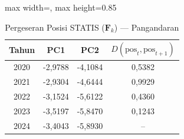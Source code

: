 \begin{table}[H]
\centering
\caption{Pergeseran Posisi STATIS ($\mathbf{F}_k$) --- Pangandaran} \label{tab:app2jarak_statis_skor_pangandaran}
\begin{adjustbox}{max width=\textwidth, max height=0.85\textheight}
\begin{tabular}{|c|c|c|c|}
\hline
\textbf{Tahun} & \textbf{PC1} & \textbf{PC2} & \textbf{$D(\text{pos}_t, \text{pos}_{t+1})$} \\
\hline
2020 & -2,9788 & -4,1084 & 0,5382 \\
2021 & -2,9304 & -4,6444 & 0,9929 \\
2022 & -3,1524 & -5,6122 & 0,4360 \\
2023 & -3,5197 & -5,8470 & 0,1243 \\
2024 & -3,4043 & -5,8930 & -- \\
\hline
\end{tabular}
\end{adjustbox}
\end{table}